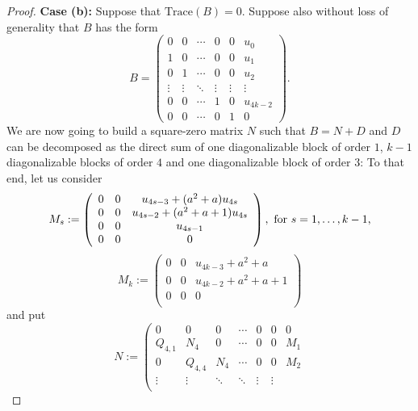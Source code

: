 \documentclass{amsart}
\theoremstyle{definition}
\theoremstyle{remark}
\numberwithin{equation}{section}
\begin{document}
\begin{proof}
{\bf Case (b):} Suppose that $\text{Trace}(B)= 0$. Suppose also without loss of generality that $B$ has the form
$$
B=\left(\begin{array}{cccccc}
                                                                          0 & 0 & \cdots & 0 & 0 &u_0\\
                                                                          1 & 0 & \cdots & 0 & 0 &u_1\\
                                                                          0 & 1 & \cdots & 0 & 0 &u_2\\
                                                                          \vdots & \vdots & \ddots & \vdots & \vdots &\vdots\\
                                                                          0 & 0 & \cdots & 1 & 0 &u_{4k-2}\\
                                                                          0 & 0 & \cdots & 0 & 1 &0
                                                                        \end{array}\right).$$
We are now going to build a square-zero matrix $N$ such that $B=N+D$ and $D$ can be decomposed as the direct sum of one diagonalizable block of order $1$, $k-1$ diagonalizable blocks of order $4$ and one diagonalizable block of order $3$: To that end, let us consider
$$M_s:=\left(
   \begin{array}{ccc}
     0 & 0 &u_{4s-3}+(a^2+a) u_{4s}\\
     0 & 0 &u_{4s-2}+(a^2+a+1) u_{4s}\\
     0 & 0 &u_{4s-1}\\
     0 & 0 &0\\
   \end{array}
 \right),\hbox{ for $s=1,\dots, k-1$,}
$$
$$M_{k}:=\left(
   \begin{array}{ccc}
      0& 0 &u_{4k-3}+a^2+a\\
      0 & 0 &u_{4k-2}+a^2+a+1\\
      0 & 0 &0\\
   \end{array}
 \right)$$
and put
$$N:=\left(
      \begin{array}{cccccccc}
        0 & 0 & 0 & \cdots & 0 &0 &  0 \\
        Q_{4,1} & N_4 & 0 & \cdots &0 & 0  & M_1 \\
        0 & Q_{4,4} & N_4 & \cdots &0 & 0  & M_2 \\
        \vdots & \vdots & \ddots & \ddots  & \vdots & \vdots \\

\end{array}$$
\end{proof}
\end{document}
